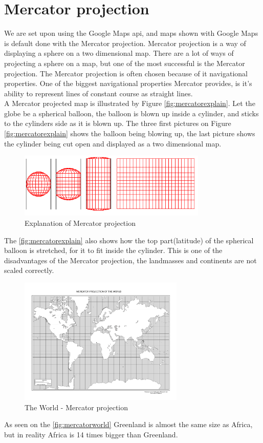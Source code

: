 \section{Mercator projection}
\label{sec:mercatorprojection}
We are set upon using the Google Maps \ac{api}, and maps shown with Google Maps is default done with the Mercator projection. Mercator projection is a way of displaying a sphere on a two dimensional map.
There are a lot of ways of projecting a sphere on a map, but one of the most successful is the Mercator projection. The Mercator projection is often chosen because of it navigational properties. One of the biggest navigational properties Mercator provides, is it's ability to represent lines of constant course as straight lines.\\
A Mercator projected map is illustrated by Figure \autoref{fig:mercatorexplain}. Let the globe be a spherical balloon, the balloon is blown up inside a cylinder, and sticks to the cylinders side as it is blown up. The three first pictures on Figure \autoref{fig:mercatorexplain} shows the balloon being blowing up, the last picture shows the cylinder being cut open and displayed as a two dimensional map.
\begin{figure}[H]
\centering
\includegraphics[width=0.8\textwidth]{img/mercatorexplain.png}
\caption{Explanation of Mercator projection \citep{mercatorexplain}}
\label{fig:mercatorexplain}
\end{figure}
The \autoref{fig:mercatorexplain} also shows how the top part(latitude) of the spherical balloon is stretched, for it to fit inside the cylinder. This is one of the disadvantages of the Mercator projection, the landmasses and continents are not scaled correctly.
\begin{figure}[H]
\centering
\includegraphics[width=0.7\textwidth]{img/mercatorworld.pdf}
\caption{The World - Mercator projection  \citep{mercatorworld}}
\label{fig:mercatorworld}
\end{figure} As seen on the \autoref{fig:mercatorworld} Greenland is almost the same size as Africa, but in reality Africa is 14 times bigger than Greenland.

